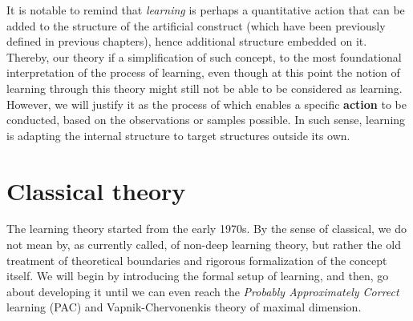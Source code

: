 It is notable to remind that \textit{learning} is perhaps a quantitative action that can be added to the structure of the artificial construct (which have been previously defined in previous chapters), hence additional structure embedded on it. Thereby, our theory if a simplification of such concept, to the most foundational interpretation of the process of learning, even though at this point the notion of learning through this theory might still not be able to be considered as learning. However, we will justify it as the process of which enables a specific \textbf{action} to be conducted, based on the observations or samples possible. In such sense, learning is adapting the internal structure to target structures outside its own. 

\section{Classical theory}

The learning theory started from the early 1970s. By the sense of classical, we do not mean by, as currently called, of non-deep learning theory, but rather the old treatment of theoretical boundaries and rigorous formalization of the concept itself. We will begin by introducing the formal setup of learning, and then, go about developing it until we can even reach the \textit{Probably Approximately Correct} learning (PAC) and Vapnik-Chervonenkis theory of maximal dimension. 

